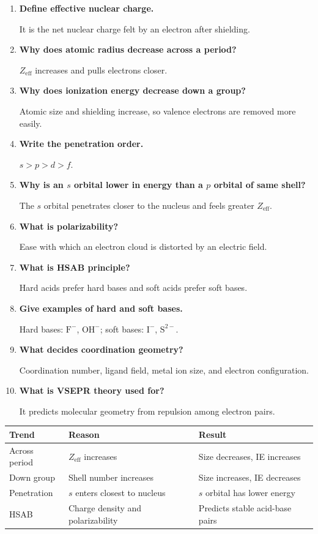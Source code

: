 \documentclass[12pt,a4paper]{article}
\newcommand{\Q}[1]{\textbf{#1}\par\noindent\ignorespaces}
\begin{document}
\begin{tcolorbox}[exambox, title={Frequently Asked / Viva Questions}]
\begin{enumerate}[topsep=0pt, label=\textbf{Q\arabic*.}, itemsep=5pt]
  \item \Q{Define effective nuclear charge.}
    It is the net nuclear charge felt by an electron after shielding.
  \item \Q{Why does atomic radius decrease across a period?}
    $Z_{\mathrm{eff}}$ increases and pulls electrons closer.
  \item \Q{Why does ionization energy decrease down a group?}
    Atomic size and shielding increase, so valence electrons are removed more easily.
  \item \Q{Write the penetration order.}
    $s>p>d>f$.
  \item \Q{Why is an $s$ orbital lower in energy than a $p$ orbital of same shell?}
    The $s$ orbital penetrates closer to the nucleus and feels greater $Z_{\mathrm{eff}}$.
  \item \Q{What is polarizability?}
    Ease with which an electron cloud is distorted by an electric field.
  \item \Q{What is HSAB principle?}
    Hard acids prefer hard bases and soft acids prefer soft bases.
  \item \Q{Give examples of hard and soft bases.}
    Hard bases: $\mathrm{F^-}$, $\mathrm{OH^-}$; soft bases: $\mathrm{I^-}$, $\mathrm{S^{2-}}$.
  \item \Q{What decides coordination geometry?}
    Coordination number, ligand field, metal ion size, and electron configuration.
  \item \Q{What is VSEPR theory used for?}
    It predicts molecular geometry from repulsion among electron pairs.
\end{enumerate}
\end{tcolorbox}

\begin{tcolorbox}[tikzbox, title={Summary Reference Table}]
\begin{tabularx}{\linewidth}{|B{3cm}|Y|Y|}
\hline
\textbf{Trend} & \textbf{Reason} & \textbf{Result} \\
\hline
Across period & $Z_{\mathrm{eff}}$ increases & Size decreases, IE increases \\
\hline
Down group & Shell number increases & Size increases, IE decreases \\
\hline
Penetration & $s$ enters closest to nucleus & $s$ orbital has lower energy \\
\hline
HSAB & Charge density and polarizability & Predicts stable acid-base pairs \\
\hline
\end{tabularx}
\end{tcolorbox}
\end{document}

